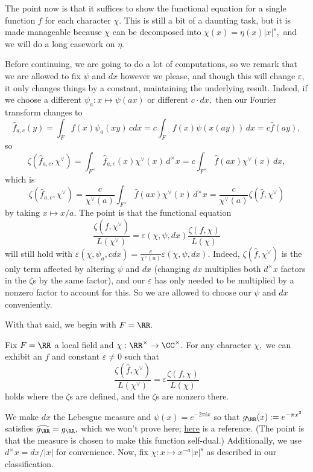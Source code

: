 The point now is that it suffices to show the functional equation for a single function $f$ for each character $\chi.$ This is still a bit of a daunting task, but it is made manageable because $\chi$ can be decomposed into $\chi(x)=\eta(x)|x|^s,$ and we will do a long casework on $\eta.$

Before continuing, we are going to do a lot of computations, so we remark that we are allowed to fix $\psi$ and $dx$ however we please, and though this will change $\varepsilon,$ it only changes things by a constant, maintaining the underlying result. Indeed, if we choose a different $\psi_a:x\mapsto\psi(ax)$ or different $c\cdot dx,$ then our Fourier transform changes to
\[\hat f_{a,c}(y)=\int_Ff(x)\psi_a(xy)\,cdx=c\int_Ff(x)\psi(x(ay))\,dx=c\hat f(ay),\]
so
\[\zeta(\hat f_{a,c},\chi^\vee)=\int_{F^\times}\hat f_{a,c}(x)\chi^\vee(x)\,d^\times x=c\int_{F^\times}\hat f(ax)\chi^\vee(x)\,dx,\]
which is
\[\zeta(\hat f_{a,c},\chi^\vee)=\frac c{\chi^\vee(a)}\int_{F^\times}\hat f(ax)\chi^\vee(x)\,d^\times x=\frac c{\chi^\vee(a)}\zeta(\hat f,\chi^\vee)\]
by taking $x\mapsto x/a.$ The point is that the functional equation
\[\frac{\zeta(\hat f,\chi^\vee)}{L(\chi^\vee)}=\varepsilon(\chi,\psi,dx)\frac{\zeta(f,\chi)}{L(\chi)}\]
will still hold with $\varepsilon(\chi,\psi_a,cdx)=\frac c{\chi^\vee(a)}\varepsilon(\chi,\psi,dx).$ Indeed, $\zeta(\hat f,\chi^\vee)$ is the only term affected by altering $\psi$ and $dx$ (changing $dx$ multiplies both $d^\times x$ factors in the $\zeta$s by the same factor), and our $\varepsilon$ has only needed to be multiplied by a nonzero factor to account for this. So we are allowed to choose our $\psi$ and $dx$ conveniently.

With that said, we begin with $F=\RR.$
\begin{proposition}
    Fix $F=\RR$ a local field and $\chi:\RR^\times\to\CC^\times.$ For any character $\chi,$ we can exhibit an $f$ and constant $\varepsilon\ne0$ such that
    \[\frac{\zeta(\hat f,\chi^\vee)}{L(\chi^\vee)}=\varepsilon\frac{\zeta(f,\chi)}{L(\chi)}\]
    holds where the $\zeta$s are defined, and the $\zeta$s are nonzero there.
\end{proposition}
We make $dx$ the Lebesgue measure and $\psi(x)=e^{-2\pi ix}$ so that $g_\RR(x):=e^{-\pi x^2}$ satisfies $\widehat{g_\RR}=g_\RR,$ which we won't prove here; \href{https://math.stackexchange.com/a/270580/869257}{here} is a reference. (The point is that the measure is chosen to make this function self-dual.) Additionally, we use $d^\times x=dx/|x|$ for convenience. Now, fix $\chi:x\mapsto x^{-a}|x|^s$ as described in our classification.

